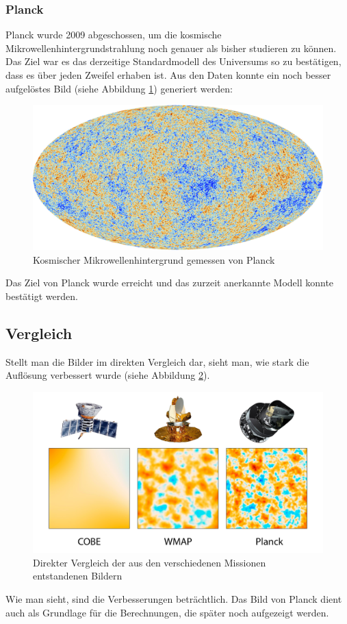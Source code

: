 \subsubsection{Planck}
Planck wurde 2009 abgeschossen, um die kosmische 
Mikrowellenhintergrundstrahlung noch genauer als bisher studieren zu können.
Das Ziel war es das derzeitige Standardmodell des Universums so zu bestätigen, 
dass es über jeden Zweifel erhaben ist.
Aus den Daten konnte ein noch besser aufgelöstes Bild (siehe Abbildung \ref{fig:CMB_Planck}) generiert werden:
\begin{figure}
	\includegraphics[width=\linewidth]{cmb/images/CMB_Planck.jpg}
	\caption{Kosmischer Mikrowellenhintergrund gemessen von Planck}
	\label{fig:CMB_Planck}
\end{figure}
Das Ziel von Planck wurde erreicht und das zurzeit anerkannte Modell konnte 
bestätigt werden.

\subsection{Vergleich}
Stellt man die Bilder im direkten Vergleich dar, sieht man, wie stark die Auflösung verbessert wurde (siehe Abbildung \ref{fig:COBE_WMAP_PLANCK}).
\begin{figure}
	\includegraphics[width=\linewidth]{cmb/images/COBE_WMAP_Planck.jpg}
	\caption{Direkter Vergleich der aus den verschiedenen Missionen 
	entstandenen Bildern}
	\label{fig:COBE_WMAP_PLANCK}
\end{figure}
Wie man sieht, sind die Verbesserungen beträchtlich.
Das Bild von Planck dient auch als Grundlage für die Berechnungen, die später 
noch aufgezeigt werden.